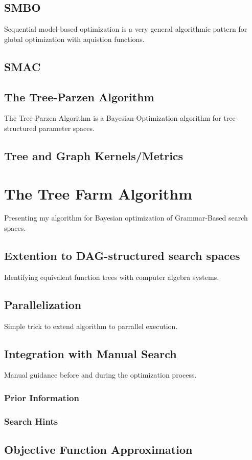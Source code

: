 \documentclass[english]{article}
\begin{document}
\subsection{SMBO}
Sequential model-based optimization is a very general algorithmic pattern for global optimization with aquistion functions.
\subsection{SMAC}


\subsection{The Tree-Parzen Algorithm}
The Tree-Parzen Algorithm \cite{bergstra_algorithms_2011} is a Bayesian-Optimization algorithm for tree-structured parameter spaces.

\subsection{Tree and Graph Kernels/Metrics}


\section{The Tree Farm Algorithm}
Presenting my algorithm for Bayesian optimization of Grammar-Based search spaces.
\subsection{Extention to DAG-structured search spaces}
Identifying equivalent function trees with computer algebra systems.
\subsection{Parallelization}
Simple trick to extend algorithm to parrallel execution.
\subsection{Integration with Manual Search}
Manual guidance before and during the optimization process.
\subsubsection{Prior Information}
\subsubsection{Search Hints}
\subsection{Objective Function Approximation}
\end{document}
